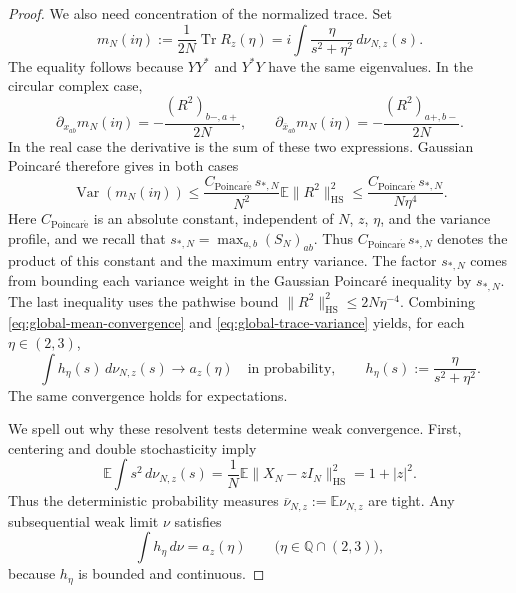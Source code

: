 \documentclass[10pt,a4paper]{amsart}
\begin{document}
\begin{proof}
We also need concentration of the normalized trace.  Set
\[
 m_N(i\eta):=\frac1{2N}\operatorname{Tr}R_z(\eta)
 =i\int\frac{\eta}{s^2+\eta^2}\,d\nu_{N,z}(s).
\]
The equality follows because $YY^*$ and $Y^*Y$ have the same eigenvalues.
In the circular complex case,
\[
 \partial_{x_{ab}}m_N(i\eta)
 =-\frac{(R^2)_{b-,a+}}{2N},\qquad
 \partial_{\overline{x}_{ab}}m_N(i\eta)
 =-\frac{(R^2)_{a+,b-}}{2N}.
\]
In the real case the derivative is the sum of these two expressions.
Gaussian Poincar\'e therefore gives in both cases
\begin{equation}\label{eq:global-trace-variance}
 \operatorname{Var}(m_N(i\eta))
 \le\frac{C_{\mathrm{Poincar\acute e}}\,s_{*,N}}{N^2}\mathbb E\|R^2\|_{\mathrm{HS}}^2
 \le\frac{C_{\mathrm{Poincar\acute e}}\,s_{*,N}}{N\eta^4}.
\end{equation}
Here $C_{\mathrm{Poincar\acute e}}$ is an absolute constant, independent of $N$, $z$, $\eta$,
and the variance profile, and we recall that
$s_{*,N}=\max_{a,b}(S_N)_{ab}$. Thus $C_{\mathrm{Poincar\acute e}}\,s_{*,N}$ denotes the
product of this constant and the maximum entry variance.
The factor $s_{*,N}$ comes from bounding each variance weight in the
Gaussian Poincar\'e inequality by $s_{*,N}$.
The last inequality uses the pathwise bound
$\|R^2\|_{\mathrm{HS}}^2\le2N\eta^{-4}$.  Combining
\eqref{eq:global-mean-convergence} and
\eqref{eq:global-trace-variance} yields, for each $\eta\in(2,3)$,
\begin{equation}\label{eq:global-resolvent-test}
 \int h_\eta(s)\,d\nu_{N,z}(s)
 \longrightarrow a_z(\eta)\quad\text{in probability},
 \qquad h_\eta(s):=\frac{\eta}{s^2+\eta^2}.
\end{equation}
The same convergence holds for expectations.

We spell out why these resolvent tests determine weak convergence.
First, centering and double stochasticity imply
\begin{equation}\label{eq:global-second-moment}
 \mathbb E\int s^2\,d\nu_{N,z}(s)
 =\frac1N\mathbb E\|X_N-zI_N\|_{\mathrm{HS}}^2
 =1+|z|^2.
\end{equation}
Thus the deterministic probability measures
$\overline\nu_{N,z}:=\mathbb E\nu_{N,z}$ are tight.  Any subsequential
weak limit $\nu$ satisfies
\begin{equation}\label{eq:global-measure-characterization}
 \int h_\eta\,d\nu=a_z(\eta)
 \qquad\bigl(\eta\in\mathbb Q\cap(2,3)\bigr),
\end{equation}
because $h_\eta$ is bounded and continuous.


\end{proof}
\end{document}

